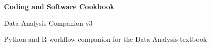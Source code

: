 \documentclass[11pt,oneside]{book}
\begin{document}
\frontmatter
\hypersetup{pageanchor=false}
\begin{titlepage}
  \centering
  \vspace*{2.5in}
  {\Huge\bfseries Coding and Software Cookbook\par}
  \vspace{1em}
  {\Large Data Analysis Companion v3\par}
  \vfill
  {\large Python and R workflow companion for the Data Analysis textbook\par}
  \thispagestyle{empty}
\end{titlepage}
\hypersetup{pageanchor=true}
\setcounter{page}{1}
\tableofcontents
\clearpage

\mainmatter

\end{document}
